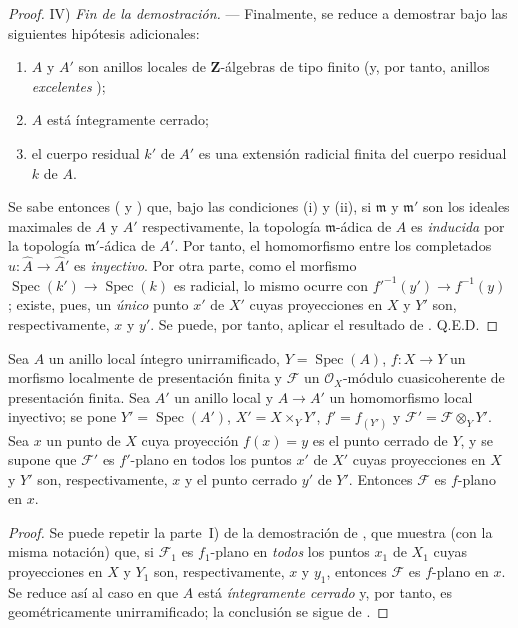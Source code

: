 \begin{proof}
\medskip
\noindent IV) \emph{Fin de la demostración.} --- Finalmente, se reduce a demostrar  bajo las siguientes hipótesis adicionales:
\begin{enumerate}[label=(\roman*)]
  \item $A$ y $A'$ son anillos locales de $\mathbf Z$-álgebras de tipo finito (y, por tanto, anillos \emph{excelentes} );
  \item $A$ está íntegramente cerrado;
  \item el cuerpo residual $k'$ de $A'$ es una extensión radicial finita del cuerpo residual $k$ de $A$.
\end{enumerate}
Se sabe entonces ( y ) que, bajo las condiciones (i) y (ii), si
$\mathfrak m$ y $\mathfrak m'$ son los ideales maximales de $A$ y $A'$
respectivamente, la topología $\mathfrak m$-ádica de $A$ es \emph{inducida} por la topología $\mathfrak m'$-ádica de $A'$.
Por tanto, el homomorfismo entre los completados $\widehat u:\widehat A\to\widehat{A}'$ es \emph{inyectivo}.
Por otra parte, como el morfismo $\operatorname{Spec}(k')\to\operatorname{Spec}(k)$ es radicial, lo mismo ocurre con $f'^{-1}(y')\to f^{-1}(y)$ ; existe, pues, un \emph{único} punto $x'$ de $X'$ cuyas proyecciones en $X$ y $Y'$ son, respectivamente, $x$ y $y'$.
Se puede, por tanto, aplicar el resultado de . Q.E.D.
\end{proof}

\begin{corollary}[11.6.2]
\label{IV.11.6.2}
Sea $A$ un anillo local íntegro unirramificado, $Y=\operatorname{Spec}(A)$, $f:X\to Y$ un morfismo localmente de presentación finita y $\mathcal F$ un $\mathcal O_X$-módulo cuasicoherente de presentación finita.
Sea $A'$ un anillo local y $A\to A'$ un homomorfismo local inyectivo; se pone $Y'=\operatorname{Spec}(A')$, $X'=X\times_Y Y'$, $f'=f_{(Y')}$ y $\mathcal F'=\mathcal F\otimes_Y Y'$.
Sea $x$ un punto de $X$ cuya proyección $f(x)=y$ es el punto cerrado de $Y$, y se supone que $\mathcal F'$ es $f'$-plano en \textup{todos} los puntos $x'$ de $X'$ cuyas proyecciones en $X$ y $Y'$ son, respectivamente, $x$ y el punto cerrado $y'$ de $Y'$.
Entonces $\mathcal F$ es $f$-plano en $x$.
\end{corollary}

\begin{proof}
Se puede repetir la parte~I) de la demostración de , que muestra (con la misma notación) que, si $\mathcal F_1$ es $f_1$-plano en \emph{todos} los puntos $x_1$ de $X_1$ cuyas proyecciones en $X$ y $Y_1$ son, respectivamente, $x$ y $y_1$, entonces $\mathcal F$ es $f$-plano en $x$.
Se reduce así al caso en que $A$ está \emph{íntegramente cerrado} y, por tanto, es geométricamente unirramificado; la conclusión se sigue de .
\end{proof}

